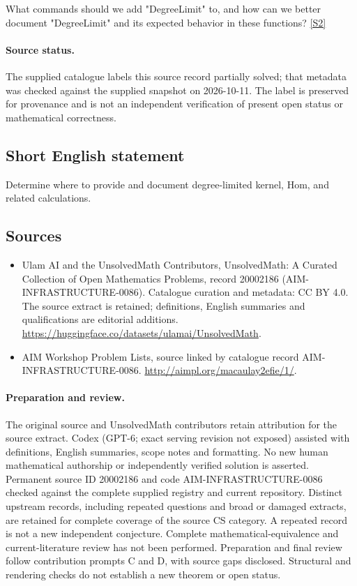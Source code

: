 \documentclass[11pt]{article}
\newcommand{\sref}[2]{\hyperlink{source:#1:#2}{[S#2]}}
\begin{document}
What commands should we add "DegreeLimit" to, and how can we better document "DegreeLimit" and its expected behavior in these functions? \sref{20002186}{2}
\paragraph{Source status.}
The supplied catalogue labels this source record partially solved; that metadata was checked against the supplied snapshot on 2026-10-11. The label is preserved for provenance and is not an independent verification of present open status or mathematical correctness.
\subsection{Short English statement}
Determine where to provide and document degree-limited kernel, Hom, and related calculations.
\subsection{Sources}
\begin{itemize}
\item[\hypertarget{source:20002186:1}{S1}] Ulam AI and the UnsolvedMath Contributors, UnsolvedMath: A Curated Collection of Open Mathematics Problems, record 20002186 (AIM-INFRASTRUCTURE-0086). Catalogue curation and metadata: CC BY 4.0. The source extract is retained; definitions, English summaries and qualifications are editorial additions.
\url{https://huggingface.co/datasets/ulamai/UnsolvedMath}.
\item[\hypertarget{source:20002186:2}{S2}] AIM Workshop Problem Lists, source linked by catalogue record AIM-INFRASTRUCTURE-0086.
\url{http://aimpl.org/macaulay2efie/1/}.
\end{itemize}
\paragraph{Preparation and review.}
The original source and UnsolvedMath contributors retain attribution for the source extract. Codex (GPT-6; exact serving revision not exposed) assisted with definitions, English summaries, scope notes and formatting. No new human mathematical authorship or independently verified solution is asserted. Permanent source ID 20002186 and code AIM-INFRASTRUCTURE-0086 checked against the complete supplied registry and current repository. Distinct upstream records, including repeated questions and broad or damaged extracts, are retained for complete coverage of the source CS category. A repeated record is not a new independent conjecture. Complete mathematical-equivalence and current-literature review has not been performed. Preparation and final review follow contribution prompts C and D, with source gaps disclosed. Structural and rendering checks do not establish a new theorem or open status.
\label{end:20002186}
\end{document}

